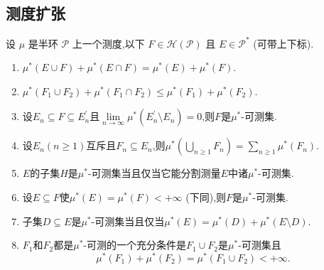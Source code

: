 \subsection{测度扩张}
\begin{1}
设 $\mu$ 是半环 $\mathcal{P}$ 上一个测度,以下 $F\in\mathcal{H}(\mathcal{P})$ 且 $E\in\mathcal{P}^*$ (可带上下标).
\begin{enumerate}[label=(\arabic*)]
\item $\mu^*(E\cup F)+\mu^*(E\cap F)=\mu^*(E)+\mu^*(F).$

\item $\mu^*(F_1\cup F_2)+\mu^*(F_1\cap F_2)\leqslant\mu^*(F_1)+\mu^*(F_2).$

\item 设$E_n\subseteq F\subseteq E_n^{\prime}$且$\lim\limits_{n\to\infty}\mu^*(E_n^{\prime}\setminus E_n)=0$,则$F$是$\mu^*$-可测集.

\item 设$E_n(n\geqslant1)$互斥且$F_n\subseteq E_n$,则$\mu^*\left(\bigcup\limits_{n\geqslant1}F_n\right)=\sum\limits_{n\geqslant1}\mu^*(F_n).$ 

\item $E$的子集$H$是$\mu^*$-可测集当且仅当它能分割测量$E$中诸$\mu^*$-可测集.

\item 设$E\subseteq F$使$\mu^*(E)=\mu^*(F)<+\infty$ (下同),则$F$是$\mu^*$-可测集.

\item 子集$D\subseteq E$是$\mu^*$-可测集当且仅当$\mu^*(E)=\mu^*(D)+\mu^*(E\setminus D).$

\item $F_{1}$和$F_2$都是$\mu^*$-可测的一个充分条件是$F_1\cup F_2$是$\mu^*$-可测集且
$$\mu^*(F_1)+\mu^*(F_2)=\mu^*(F_1\cup F_2)<+\infty.$$
\end{enumerate}
\end{1}   

